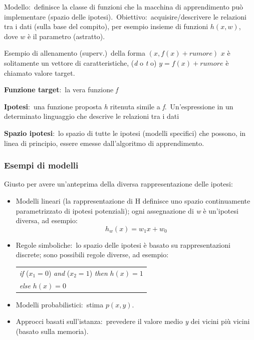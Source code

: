 Modello:\ definisce la classe di funzioni che la macchina di apprendimento può implementare (spazio delle ipotesi).\ Obiettivo:\ acquisire/descrivere le relazioni tra i dati (sulla base del compito), per esempio insieme di funzioni $h (x, w)$, dove $w$ è il parametro (astratto).

Esempio di allenamento (superv.)\ della forma $(x, f (x) + rumore)$ $x$ è solitamente un vettore di caratteristiche, (\textit{d} o \textit{t} o) $y = f (x) + rumore$ è chiamato valore target.

\begin{flushleft}
	\textbf{Funzione target}:\ la vera funzione \textit{f}

	\textbf{Ipotesi}:\ una funzione proposta \textit{h} ritenuta simile a \textit{f}.\
	Un'espressione in un determinato linguaggio che descrive le relazioni tra i dati

	\textbf{Spazio ipotesi}:\ lo spazio di tutte le ipotesi (modelli specifici) che possono, in linea di principio, essere emesse dall'algoritmo di apprendimento.
\end{flushleft}

\subsubsection{Esempi di modelli}

Giusto per avere un'anteprima della diversa rappresentazione delle ipotesi:

\begin{itemize}
	\item Modelli lineari (la rappresentazione di H definisce uno spazio continuamente parametrizzato di ipotesi potenziali); ogni assegnazione di \textit{w} è un'ipotesi diversa, ad esempio:
	      \[
		      h_w(x) = w_1 x + w_0
	      \]
	\item Regole simboliche:\ lo spazio delle ipotesi è basato su rappresentazioni discrete; sono possibili regole diverse, ad esempio:
	      \begin{table}[H]
		      \centering
		      \begin{tabular}{l}
			      \textit{if} ($x_1 = 0$) \textit{and} ($x_2 = 1$) \textit{then} $h(x) = 1$ \\
			      \textit{else} $h(x) = 0$                                                  \\
		      \end{tabular}
	      \end{table}
	\item Modelli probabilistici:\ stima $p (x, y)$.
	\item Approcci basati sull'istanza:\ prevedere il valore medio \textit{y} dei vicini più vicini (basato sulla memoria).
\end{itemize}

